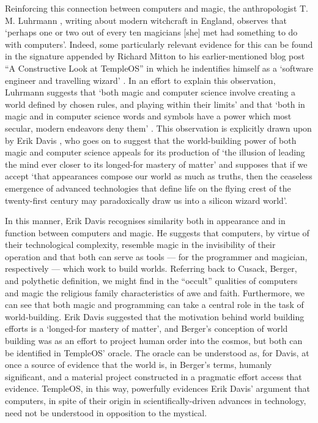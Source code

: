 Reinforcing this connection between computers and magic,
the anthropologist T. M. Luhrmann \parencite*[106]{Luhrmann89},
writing about modern witchcraft in England, observes that
`perhaps one or two out of every ten magicians [she] met
had something to do with computers'.
Indeed, some particularly relevant evidence for this can be found
in the signature appended by Richard Mitton to his earlier-mentioned blog post
``A Constructive Look at TempleOS'' in which he indentifies himself as a
`software engineer and travelling wizard' \parencite{CodersNotes}.
In an effort to explain this observation, Luhrmann suggests that
`both magic and computer science involve creating a world
defined by chosen rules, and playing within their limits' and that
`both in magic and in computer science words and symbols have a power which
most secular, modern endeavors deny them' \parencite[106]{Luhrmann89}.
This observation is explicitly drawn upon by Erik Davis
\parencite*[181]{Davis98}, who goes on to suggest that the world-building
power of both magic and computer science appeals for its production of
`the illusion of leading the mind ever closer to its longed-for
mastery of matter' and supposes that if we accept
`that appearances compose our world as much as truths,
then the ceaseless emergence of advanced technologies that define life
on the flying crest of the twenty-first century may paradoxically draw us into
a silicon wizard world'.

In this manner, Erik Davis recognises similarity both in appearance
and in function between computers and magic.
He suggests that computers, by virtue of their technological complexity,
resemble magic in the invisibility of their operation and that both can
serve as tools --- for the programmer and magician, respectively ---
which work to build worlds.
Referring back to Cusack, Berger, and polythetic definition, we might find
in the ``occult'' qualities of computers and magic the religious family
characteristics of awe and faith.
Furthermore, we can see that both magic and programming can take a
central role in the task of world-building.
Erik Davis suggested that the motivation behind world building efforts
is a `longed-for mastery of matter', and Berger's conception of
world building was as an effort to project human order into the cosmos,
but both can be identified in TempleOS' oracle.
The oracle can be understood as, for Davis, at once a source of evidence
that the world is, in Berger's terms, humanly significant, and a material
project constructed in a pragmatic effort access that evidence.
TempleOS, in this way, powerfully evidences Erik Davis' argument that
computers, in spite of their origin in scientifically-driven advances in
technology, need not be understood in opposition to the mystical.


